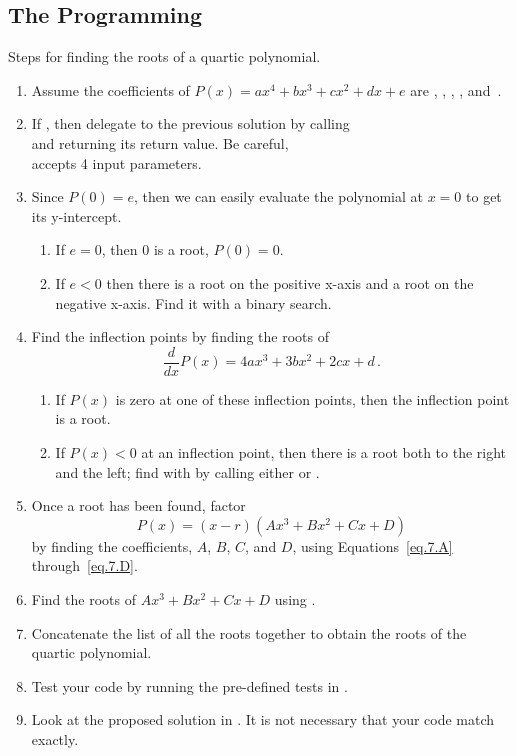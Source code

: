 \subsection{The Programming}

Steps for finding the roots of a quartic polynomial.

\begin{enumerate}
\item Assume the coefficients of $P(x) = a x^4 + b x^3 + c x^2 + d x + e$ are
  ,  ,  ,  , and~.
\item If , then delegate to the previous solution by
  calling \\
   and returning its return
  value.  Be careful, \\
   accepts 4 input
  parameters.
\item Since $P(0) = e$, then we can easily evaluate the polynomial at
  $x=0$ to get its y-intercept.
  \begin{enumerate}
  \item If $e = 0$, then 0 is a root, $P(0) = 0$.
  \item If $e<0$ then there is a root on the positive x-axis and a
    root on the negative x-axis.  Find it with a binary search.
  \end{enumerate}
\item Find the inflection points by finding the roots
  of \[\frac{d}{dx} P(x) = 4 a x^3 + 3 b x^2 + 2 c x + d\,.\]
  \begin{enumerate}
  \item If $P(x)$ is zero at one of these inflection points, then the
    inflection point is a root.
  \item If $P(x) < 0$ at an inflection point, then there is a root
    both to the right and the left; find with by calling either
     or .
  \end{enumerate}
\item Once a root has been found, factor \[P(x) = (x-r)(Ax^3 + Bx^2 +
  Cx + D)\] by finding the coefficients, $A$, $B$, $C$, and $D$, using
  Equations~\eqref{eq.7.A} through~\eqref{eq.7.D}.
\item Find the roots of $Ax^3 + Bx^2 + Cx + D$ using
  .
  \item Concatenate the list of all the roots together to obtain the
    roots of the quartic polynomial.

\item Test your code by running the pre-defined tests in
  .

\item Look at the proposed solution in .
  It is not necessary that your code match exactly.

\end{enumerate}
